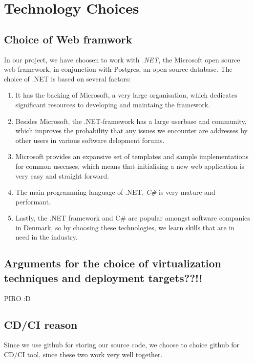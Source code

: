 
\section{Technology Choices}

\subsection{Choice of Web framwork}
In our project, we have choosen to work with \textit{.NET}, the Microsoft open source web framework, in conjunction with Postgres, an open source database.
The choice of .NET is based on several factors:

\begin{enumerate}
	\item It has the backing of Microsoft, a very large organisation, which dedicates significant resources to developing and maintaing the framework.
	\item Besides Microsoft, the .NET-framework has a large userbase and community, which improves the probability that any issues we encounter are addresses by other users in various software delopment forums.
	\item Microsoft provides an expansive set of templates and sample implementations for common usecases, which means that initialising a new web application is very easy and straight forward.
	\item The main programming language of .NET, \textit{C\#} is very mature and performant. %
	\item Lastly, the .NET framework and C\# are popular amongst software companies in Denmark, so by choosing these technologies, we learn skills that are in need in the industry.
\end{enumerate}


\subsection{Arguments for the choice of virtualization techniques and deployment targets??!!}
PIRO :D

\subsection{CD/CI reason}
Since we use github for storing our source code, we choose to choice github for CD/CI tool, since these two work very well together.





